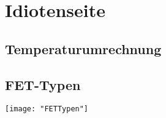 \section{Idiotenseite}
\subsection{Temperaturumrechnung}

\subsection{FET-Typen}
\texttt{[image: "FETTypen"]}